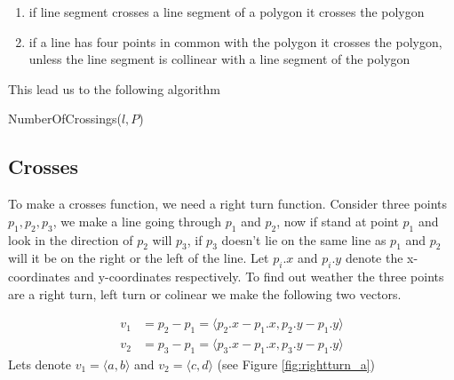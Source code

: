 \begin{enumerate}
	\item if line segment crosses a line segment of a polygon it crosses the
		polygon
	\item if a line has four points  in common with the polygon it crosses the
		polygon, unless the line segment is collinear with a line segment of the
		polygon 
\end{enumerate}

This lead us to the following algorithm
\begin{algorithm} 
	\caption{NumberOfCrossings($l,P$)}
	\begin{algorithmic}[1] 
		\State {}
	\end{algorithmic}
\end{algorithm}

\subsection{Crosses}
To make a crosses function, we need a right turn function. Consider three
points $p_1,p_2,p_3$, we make a line going through $p_1$ and $p_2$, now if
stand at point $p_1$ and look in the direction of $p_2$ will $p_3$, if $p_3$
doesn't lie on the same line as $p_1$ and $p_2$ will it be on the
right or the left of the line. 
Let $p_i.x$ and $p_i.y$ denote the x-coordinates
and y-coordinates respectively.
To find out weather the three points are a right turn, left turn or colinear we
make the following two vectors.

\begin{align*}
	v_1 &=p_2-p_1 = \langle p_2.x-p_1.x,p_2.y-p_1.y\rangle\\
	v_2 &=p_3-p_1 = \langle p_3.x-p_1.x,p_3.y-p_1.y\rangle
\end{align*}
Lets denote $v_1 = \langle a,b\rangle$ and $v_2 = \langle c,d\rangle$
(see Figure \ref{fig:rightturn_a})
